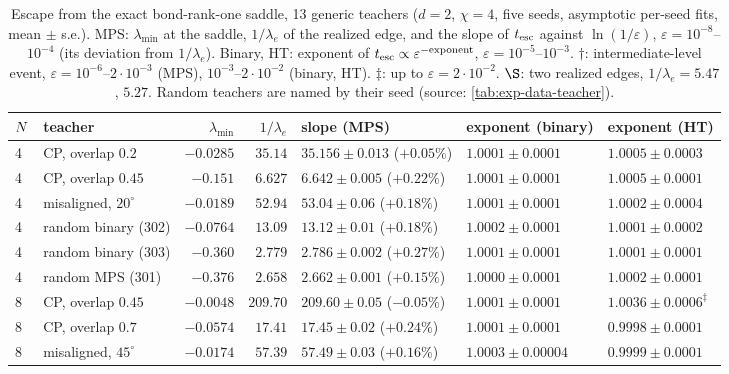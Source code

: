 \begin{table}[ht]
  \centering
  \caption{Escape from the exact bond-rank-one saddle, 13 generic teachers ($d=2$, $\chi=4$, five seeds,
    asymptotic per-seed fits, mean $\pm$ s.e.). MPS: $\lambda_{\min}$ at the saddle, $1/\lambda_e$ of the realized edge,
    and the slope of $t_{\rm esc}$ against $\ln(1/\varepsilon)$, $\varepsilon=10^{-8}$--$10^{-4}$ (its deviation from
    $1/\lambda_e$). Binary, HT: exponent of $t_{\rm esc}\propto\varepsilon^{-\text{exponent}}$, $\varepsilon=10^{-5}$--$10^{-3}$.
    $\dagger$: intermediate-level event, $\varepsilon=10^{-6}$--$2\cdot10^{-3}$ (MPS), $10^{-3}$--$2\cdot10^{-2}$ (binary, HT).
    $\ddagger$: up to $\varepsilon=2\cdot10^{-2}$. $\S$: two realized edges, $1/\lambda_e=5.47$, $5.27$. Random teachers are
    named by their seed (source: \cref{tab:exp-data-teacher}).}
  \label{tab:dt-saddle}
  \footnotesize
  \begin{tabular}{@{}llrrlll@{}}
    \toprule
    $N$ & teacher & $\lambda_{\min}$ & $1/\lambda_e$ & slope (MPS) & exponent (binary) & exponent (HT) \\
    \midrule
    4 & CP, overlap $0.2$           & $-0.0285$ & $35.14$  & $35.156\pm0.013$ ($+0.05\%$) & $1.0001\pm0.0001$ & $1.0005\pm0.0003$ \\
    4 & CP, overlap $0.45$          & $-0.151$  & $6.627$  & $6.642\pm0.005$ ($+0.22\%$)  & $1.0001\pm0.0001$ & $1.0005\pm0.0001$ \\
    4 & misaligned, $20^\circ$      & $-0.0189$ & $52.94$  & $53.04\pm0.06$ ($+0.18\%$)   & $1.0001\pm0.0001$ & $1.0002\pm0.0004$ \\
    4 & random binary (302)         & $-0.0764$ & $13.09$  & $13.12\pm0.01$ ($+0.18\%$)   & $1.0002\pm0.0001$ & $1.0001\pm0.0002$ \\
    4 & random binary (303)         & $-0.360$  & $2.779$  & $2.786\pm0.002$ ($+0.27\%$)  & $1.0001\pm0.0001$ & $1.0001\pm0.0001$ \\
    4 & random MPS (301)            & $-0.376$  & $2.658$  & $2.662\pm0.001$ ($+0.15\%$)  & $1.0000\pm0.0001$ & $1.0002\pm0.0001$ \\
    8 & CP, overlap $0.45$          & $-0.0048$ & $209.70$ & $209.60\pm0.05$ ($-0.05\%$)  & $1.0001\pm0.0001$ & $1.0036\pm0.0006^\ddagger$ \\
    8 & CP, overlap $0.7$           & $-0.0574$ & $17.41$  & $17.45\pm0.02$ ($+0.24\%$)   & $1.0001\pm0.0001$ & $0.9998\pm0.0001$ \\
    8 & misaligned, $45^\circ$      & $-0.0174$ & $57.39$  & $57.49\pm0.03$ ($+0.16\%$)   & $1.0003\pm0.00004$ & $0.9999\pm0.0001$ \\

\end{tabular}
\end{table}
